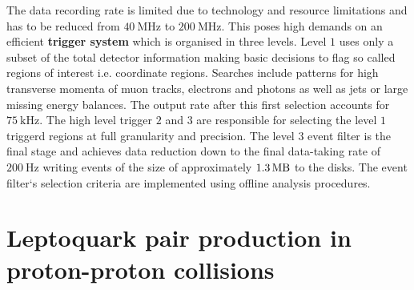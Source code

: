 The data recording rate is limited due to technology and resource limitations and has to be reduced from $\SI{40}{\mega\hertz}$ to $\SI{200}{\mega\hertz}$. This poses high demands on an efficient \textbf{trigger system} which is organised in three levels. Level $1$ uses only a subset of the total detector information making basic decisions to flag so called regions of interest i.e. coordinate regions. Searches include patterns for high transverse momenta of muon tracks, electrons and photons as well as jets or large missing energy balances. The output rate after this first selection accounts for $\SI{75}{\kilo\hertz}$. The high level trigger $2$ and $3$ are responsible for selecting the level $1$ triggerd regions at full granularity and precision. The level $3$ event filter is the final stage and achieves data reduction down to the final data-taking rate of $\SI{200}{\hertz}$ writing events of the size of approximately $\SI{1.3}{\mega\byte}$ to the disks. The event filter`s selection criteria are implemented using offline analysis procedures. \cite{ATLASJINST}%
\section{Leptoquark pair production in proton-proton collisions}\label{LQpp}
